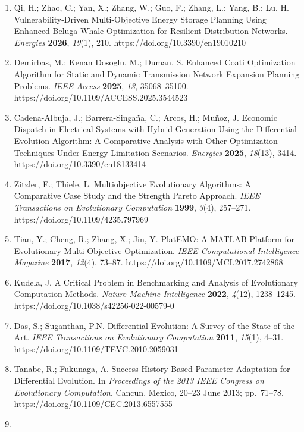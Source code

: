 \documentclass[
  10pt,
  a4paper,
]{article}
\begin{document}
\begin{enumerate}
  https://doi.org/10.3390/en19143262
\item
  Qi, H.; Zhao, C.; Yan, X.; Zhang, W.; Guo, F.; Zhang, L.; Yang, B.;
  Lu, H. Vulnerability-Driven Multi-Objective Energy Storage Planning
  Using Enhanced Beluga Whale Optimization for Resilient Distribution
  Networks. \emph{Energies} \textbf{2026}, \emph{19}(1), 210.
  https://doi.org/10.3390/en19010210
\item
  Demirbas, M.; Kenan Dosoglu, M.; Duman, S. Enhanced Coati Optimization
  Algorithm for Static and Dynamic Transmission Network Expansion
  Planning Problems. \emph{IEEE Access} \textbf{2025}, \emph{13},
  35068--35100. https://doi.org/10.1109/ACCESS.2025.3544523
\item
  Cadena-Albuja, J.; Barrera-Singaña, C.; Arcos, H.; Muñoz, J. Economic
  Dispatch in Electrical Systems with Hybrid Generation Using the
  Differential Evolution Algorithm: A Comparative Analysis with Other
  Optimization Techniques Under Energy Limitation Scenarios.
  \emph{Energies} \textbf{2025}, \emph{18}(13), 3414.
  https://doi.org/10.3390/en18133414
\item
  Zitzler, E.; Thiele, L. Multiobjective Evolutionary Algorithms: A
  Comparative Case Study and the Strength Pareto Approach. \emph{IEEE
  Transactions on Evolutionary Computation} \textbf{1999}, \emph{3}(4),
  257--271. https://doi.org/10.1109/4235.797969
\item
  Tian, Y.; Cheng, R.; Zhang, X.; Jin, Y. PlatEMO: A MATLAB Platform for
  Evolutionary Multi-Objective Optimization. \emph{IEEE Computational
  Intelligence Magazine} \textbf{2017}, \emph{12}(4), 73--87.
  https://doi.org/10.1109/MCI.2017.2742868
\item
  Kudela, J. A Critical Problem in Benchmarking and Analysis of
  Evolutionary Computation Methods. \emph{Nature Machine Intelligence}
  \textbf{2022}, \emph{4}(12), 1238--1245.
  https://doi.org/10.1038/s42256-022-00579-0
\item
  Das, S.; Suganthan, P.N. Differential Evolution: A Survey of the
  State-of-the-Art. \emph{IEEE Transactions on Evolutionary Computation}
  \textbf{2011}, \emph{15}(1), 4--31.
  https://doi.org/10.1109/TEVC.2010.2059031
\item
  Tanabe, R.; Fukunaga, A. Success-History Based Parameter Adaptation
  for Differential Evolution. In \emph{Proceedings of the 2013 IEEE
  Congress on Evolutionary Computation}, Cancun, Mexico, 20--23 June
  2013; pp.~71--78. https://doi.org/10.1109/CEC.2013.6557555
\item

\end{enumerate}
\end{document}
